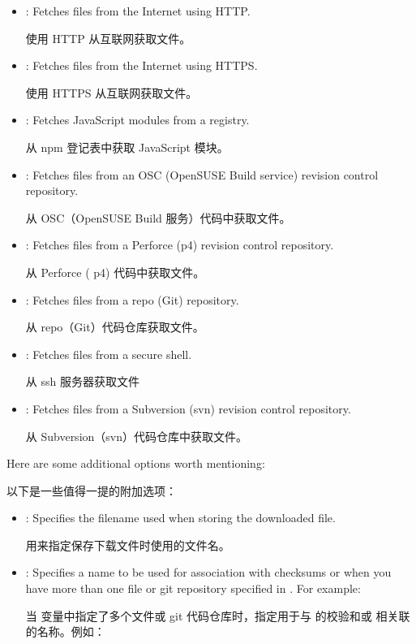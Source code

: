 {\begin{itemize}
\medskip
从 Mercurial ( hg) 代码仓库中获取文件。

\item {}: Fetches files from the Internet using HTTP.

\medskip
使用 HTTP 从互联网获取文件。

\item {}: Fetches files from the Internet using HTTPS.

\medskip
使用 HTTPS 从互联网获取文件。

\item {}: Fetches JavaScript modules from a registry.

\medskip
从 npm 登记表中获取 JavaScript 模块。

\item {}: Fetches files from an OSC (OpenSUSE Build service) revision control repository.

\medskip
从 OSC（OpenSUSE Build 服务）代码中获取文件。

\item {}: Fetches files from a Perforce (p4) revision control repository.

\medskip
从 Perforce ( p4) 代码中获取文件。

\item {}: Fetches files from a repo (Git) repository.

\medskip
从 repo（Git）代码仓库获取文件。

\item {}: Fetches files from a secure shell.

\medskip
从 ssh 服务器获取文件

\item {}: Fetches files from a Subversion (svn) revision control repository.

\medskip
从 Subversion（svn）代码仓库中获取文件。
\end{itemize}

\medskip
Here are some additional options worth mentioning:

\medskip
以下是一些值得一提的附加选项：

\medskip
\begin{itemize}
\setlength\itemsep{1.0em}
\item {}: Specifies the filename used when storing the downloaded file.\par
用来指定保存下载文件时使用的文件名。

\item {}: Specifies a name to be used for association with  checksums or  when you have more than one file or git repository specified in . For example: \par
当  变量中指定了多个文件或 git 代码仓库时，指定用于与  的校验和或  相关联的名称。例如：


\end{itemize}}
